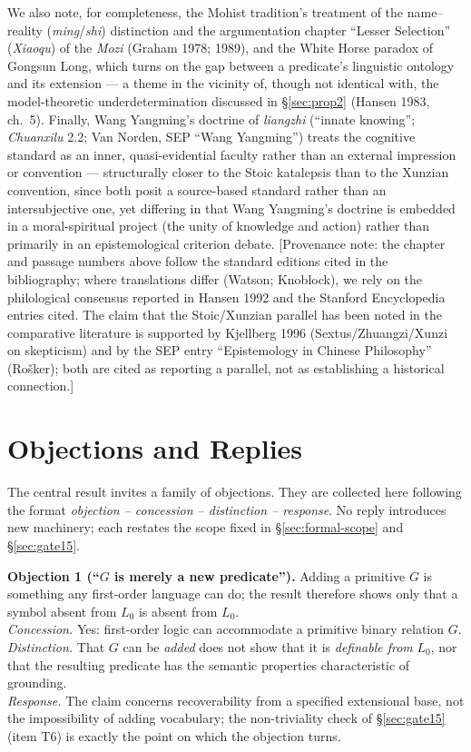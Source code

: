 \documentclass[11pt]{article}
\theoremstyle{plain}
\theoremstyle{definition}
\theoremstyle{remark}
\begin{document}
We also note, for completeness, the Mohist tradition's treatment of the
name--reality (\emph{ming}/\emph{shi}) distinction and the argumentation
chapter ``Lesser Selection'' (\emph{Xiaoqu}) of the \emph{Mozi} (Graham
1978; 1989), and the White Horse paradox of Gongsun Long, which turns
on the gap between a predicate's linguistic ontology and its extension
--- a theme in the vicinity of, though not identical with, the
model-theoretic underdetermination discussed in \S\ref{sec:prop2}
(Hansen 1983, ch.~5). Finally, Wang Yangming's doctrine of
\emph{liangzhi} (``innate knowing''; \emph{Chuanxilu} 2.2; Van Norden,
SEP ``Wang Yangming'') treats the cognitive standard as an inner,
quasi-evidential faculty rather than an external impression or
convention --- structurally closer to the Stoic katalepsis than to the
Xunzian convention, since both posit a source-based standard rather
than an intersubjective one, yet differing in that Wang Yangming's
doctrine is embedded in a moral-spiritual project (the unity of
knowledge and action) rather than primarily in an epistemological
criterion debate. [Provenance note: the chapter and passage numbers
above follow the standard editions cited in the bibliography; where
translations differ (Watson; Knoblock), we rely on the philological
consensus reported in Hansen 1992 and the Stanford Encyclopedia entries
cited. The claim that the Stoic/Xunzian parallel has been noted in the
comparative literature is supported by Kjellberg 1996
(Sextus/Zhuangzi/Xunzi on skepticism) and by the SEP entry
``Epistemology in Chinese Philosophy'' (Ro\v{s}ker); both are cited as
reporting a parallel, not as establishing a historical connection.]

\section{Objections and Replies}
\label{sec:objections}

The central result invites a family of objections. They are collected
here following the format \emph{objection -- concession -- distinction
-- response}. No reply introduces new machinery; each restates the
scope fixed in \S\ref{sec:formal-scope} and \S\ref{sec:gate15}.

\medskip
\textbf{Objection 1 (``$G$ is merely a new predicate'').} Adding a
primitive $G$ is something any first-order language can do; the result
therefore shows only that a symbol absent from $L_0$ is absent from
$L_0$.\\
\emph{Concession.} Yes: first-order logic can accommodate a primitive
binary relation $G$.\\
\emph{Distinction.} That $G$ can be \emph{added} does not show that it
is \emph{definable from} $L_0$, nor that the resulting predicate has
the semantic properties characteristic of grounding.\\
\emph{Response.} The claim concerns recoverability from a specified
extensional base, not the impossibility of adding vocabulary; the
non-triviality check of \S\ref{sec:gate15} (item T6) is exactly the
point on which the objection turns.
\end{document}
